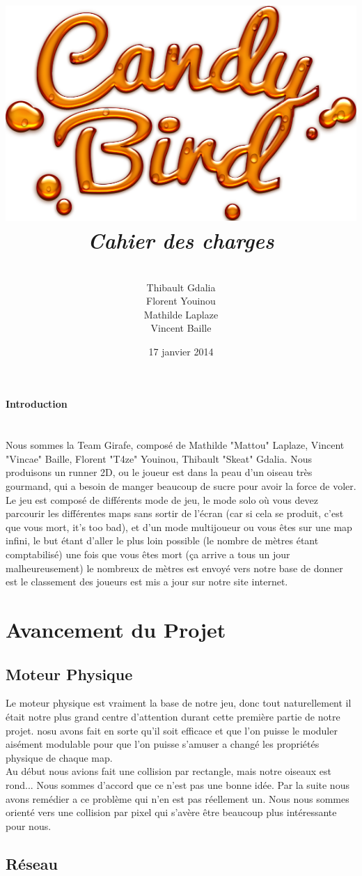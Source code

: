 \documentclass [11pt]{report}
\title{
	\includegraphics[scale=0.43]{images/Logojeu.png}
	 \\\vspace{20mm}
	\textbf{\Huge \itshape Cahier des charges }
	}
\author{ \\\vspace{2mm}
	Thibault Gdalia\\\vspace{2mm}
	Florent Youinou\\\vspace{2mm}
	Mathilde Laplaze\\\vspace{2mm}
	Vincent Baille \\\vspace{30mm}
	}
\date{17 janvier 2014}
\begin{document}
\renewcommand{\baselinestretch}{0.001}
\maketitle
\tableofcontents

\newpage


\textbf{{\Huge Introduction}}\\
\\
\\
\indent Nous sommes la Team Girafe, composé de Mathilde "Mattou" Laplaze, Vincent "Vincae" Baille, Florent "T4ze" Youinou, Thibault "Skeat" Gdalia. Nous produisons un runner 2D, ou le joueur est dans la peau d'un oiseau très gourmand, qui a besoin de manger beaucoup de sucre pour avoir la force de voler. Le jeu est composé de différents mode de jeu, le mode solo où vous devez parcourir les différentes maps sans sortir de l'écran (car si cela se produit, c'est que vous mort, it's too bad), et d'un mode multijoueur ou vous êtes sur une map infini, le but étant d'aller le plus loin possible (le nombre de mètres étant comptabilisé) une fois que vous êtes mort (ça arrive a tous un jour malheureusement) le nombreux de mètres est envoyé vers notre base de donner est le classement des joueurs est mis a jour sur notre site internet.

\chapter{Avancement du Projet}
	\section{Moteur Physique}
		Le moteur physique est vraiment la base de notre jeu, donc tout naturellement il était notre plus grand centre d'attention durant cette première partie de notre projet. nosu avons fait en sorte qu'il soit efficace et que l'on puisse le moduler aisément modulable pour que l'on puisse s'amuser a changé les propriétés physique de chaque map.\\
		\indent Au début nous avions fait une collision par rectangle, mais notre oiseaux est rond... Nous sommes d'accord que ce n'est pas une bonne idée. Par la suite nous avons remédier a ce problème qui n'en est pas réellement un. Nous nous sommes orienté vers une collision par pixel qui s'avère être beaucoup plus intéressante pour nous.
	\section{Réseau}
\end{document}
